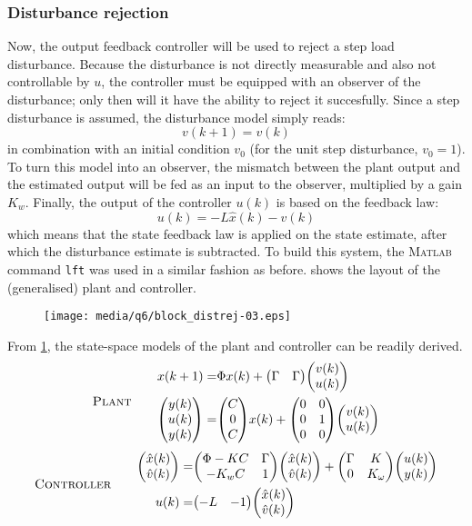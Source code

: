 \subsubsection{Disturbance rejection}
Now, the output feedback controller will be used to reject a step load disturbance. Because the disturbance is not directly measurable and also not controllable by $u$, the controller must be equipped with an observer of the disturbance; only then will it have the ability to reject it succesfully. Since a step disturbance is assumed, the disturbance model simply reads:
                                $$v(k + 1) = v(k)$$
in combination with an initial condition $v_0$ (for the unit step disturbance, $v_0 = 1$). To turn this model into an observer, the mismatch between the plant output and the estimated output will be fed as an input to the observer, multiplied by a gain $K_w$. Finally, the output of the controller $u(k)$ is based on the feedback law:
                                $$u(k) = -L\hat{x}(k) - \hat{v}(k)$$
which means that the state feedback law is applied on the state estimate, after which the disturbance estimate is subtracted. To build this system, the \textsc{Matlab} command \texttt{lft} was used in a similar fashion as before.  shows the layout of the (generalised) plant and controller.
\begin{figure}[ht!]
    \centering
    \texttt{[image: media/q6/block\_distrej-03.eps]}
    \caption{}
    \label{fig:q6_block_distrej}
\end{figure}
From \cref{fig:q6_block_distrej}, the state-space models of the plant and controller can be readily derived.
\begin{equation}
    \text{\textsc{Plant}}\qquad
    \begin{aligned}
        x(k+1) =& \Phi x(k) + \mqty(\Gamma&\Gamma)\mqty(v(k)\\u(k))\\
        \mqty(y(k)\\u(k)\\y(k)) =& \mqty(C\\0\\C)x(k) + \mqty(0&0\\0&1\\0&0)\mqty(v(k)\\u(k))\\ 
    \end{aligned}
\end{equation}
\phantom{x}
\begin{equation}
    \text{\textsc{Controller}}\qquad
    \begin{aligned}
        \mqty(\hat{x}(k)\\\hat{v}(k)) =& \mqty(\Phi-KC & \Gamma\\-K_wC&1)\mqty(\hat{x}(k)\\\hat{v}(k)) + \mqty(\Gamma&K\\0&K_\omega)\mqty(u(k)\\y(k))\\
        u(k) =& \mqty(-L&-1)\mqty(\hat{x}(k)\\\hat{v}(k))
    \end{aligned}
\end{equation}
